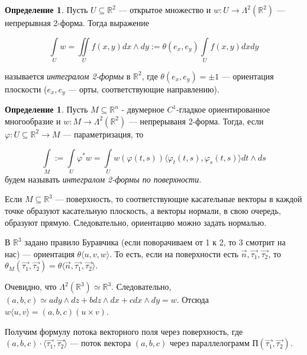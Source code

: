 \documentclass[a5paper]{article}
\newcounter{through}
\theoremstyle{plain}
\theoremstyle{definition}
\newtheorem{definition}[through]{Определение}
\numberwithin{through}{section}
\numberwithin{equation}{section}
\begin{document}
\begin{definition}
	Пусть $U \subseteq \mathbb{R}^2$ --- открытое множество и $w : U \to \Lambda^2 (\mathbb{R}^2)$ --- непрерывная 2-форма. Тогда выражение 
	
	\begin{equation*}
		\int\limits_{U} w = \iint\limits_{U} f(x, y) dx \wedge dy := \theta(e_x, e_y) \int\limits_{U} f(x, y) dxdy
	\end{equation*} 
	
	называется \textit{интегралом 2-формы} в $\mathbb{R}^2$, где $\theta(e_x, e_y) = \pm1$ --- ориентация плоскости ($e_x, e_y$ --- орты, соответствующие направлению).
\end{definition}

\begin{definition}
	Пусть $M \subseteq \mathbb{R}^n$ - двумерное $C^1$-гладкое ориентированное многообразие и $w : M \to \Lambda^2 (\mathbb{R}^2)$ --- непрерываня 2-форма. Тогда, если $\varphi : U \subseteq \mathbb{R}^2 \to M$ --- параметризация, то 
	
	\begin{equation*}
		\int\limits_{M} := \int\limits_{U} \varphi^* w = \int\limits_{U} w(\varphi (t, s)) \langle \varphi_t (t, s), \varphi_s (t, s) \rangle dt \wedge ds
	\end{equation*}
	будем называть \textit{интегралом 2-формы по поверхности}.
\end{definition}

Если $M \subseteq \mathbb{R}^3$ --- поверхность, то соответствующие касательные векторы в каждой точке образуют касательную плоскость, а векторы нормали, в свою очередь, образуют прямую. Следовательно, ориентацию можно задать нормалью. 

В $\mathbb{R}^3$ задано правило Буравчика (если поворачиваем от 1 к 2, то 3 смотрит на нас) --- ориентация $\theta \langle u, v, w \rangle$. То есть, если на поверхности есть $\vec{n}, \vec{\tau_1}, \vec{\tau_2}$, то $\theta_M (\vec{\tau_1}, \vec{\tau_2}) = \theta \langle \vec{n}, \vec{\tau_1}, \vec{\tau_2} \rangle$.

Очевидно, что $\Lambda^2 (\mathbb{R}^3) \simeq \mathbb{R}^3$. Следовательно, $(a, b, c) \simeq a dy \wedge dz + b dz \wedge dx + c dx \wedge dy = w$. Отсюда $w \langle u, v \rangle = (a, b, c) (u \times v)$.

Получим формулу потока векторного поля через поверхность, где $(a, b, c) \cdot \langle \vec{\tau_1}, \vec{\tau_2} \rangle$ --- поток вектора $(a, b, c)$ через параллелограмм $\text{П}(\vec{\tau_1}, \vec{\tau_2})$.
\end{document}
